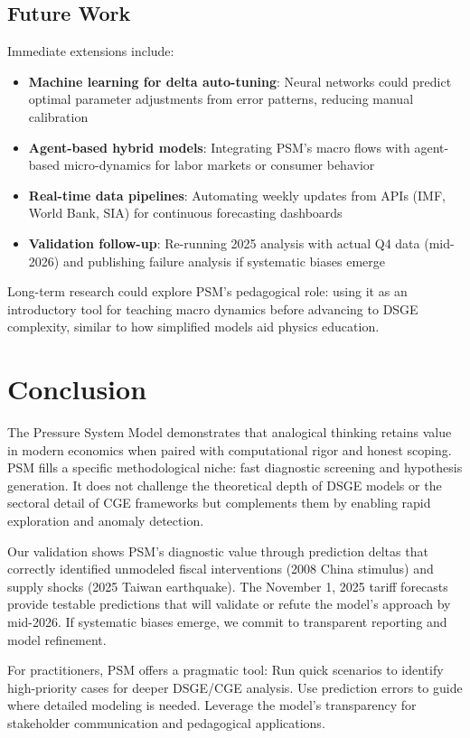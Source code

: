 \documentclass[11pt]{article}
\begin{document}
\subsection{Future Work}
Immediate extensions include:
\begin{itemize}
\item \textbf{Machine learning for delta auto-tuning}: Neural networks could predict optimal parameter adjustments from error patterns, reducing manual calibration
\item \textbf{Agent-based hybrid models}: Integrating PSM's macro flows with agent-based micro-dynamics for labor markets or consumer behavior
\item \textbf{Real-time data pipelines}: Automating weekly updates from APIs (IMF, World Bank, SIA) for continuous forecasting dashboards
\item \textbf{Validation follow-up}: Re-running 2025 analysis with actual Q4 data (mid-2026) and publishing failure analysis if systematic biases emerge
\end{itemize}

Long-term research could explore PSM's pedagogical role: using it as an introductory tool for teaching macro dynamics before advancing to DSGE complexity, similar to how simplified models aid physics education.

\section{Conclusion}
The Pressure System Model demonstrates that analogical thinking retains value in modern economics when paired with computational rigor and honest scoping. PSM fills a specific methodological niche: fast diagnostic screening and hypothesis generation. It does not challenge the theoretical depth of DSGE models or the sectoral detail of CGE frameworks but complements them by enabling rapid exploration and anomaly detection.

Our validation shows PSM's diagnostic value through prediction deltas that correctly identified unmodeled fiscal interventions (2008 China stimulus) and supply shocks (2025 Taiwan earthquake). The November 1, 2025 tariff forecasts provide testable predictions that will validate or refute the model's approach by mid-2026. If systematic biases emerge, we commit to transparent reporting and model refinement.

For practitioners, PSM offers a pragmatic tool: Run quick scenarios to identify high-priority cases for deeper DSGE/CGE analysis. Use prediction errors to guide where detailed modeling is needed. Leverage the model's transparency for stakeholder communication and pedagogical applications.
\end{document}

